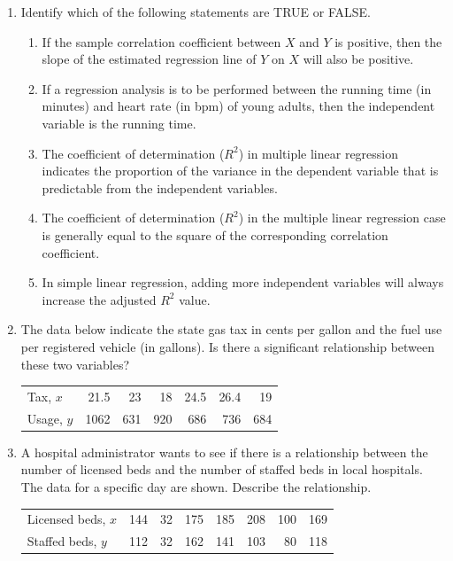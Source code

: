 \documentclass{article}
\begin{document}
\begin{enumerate}
    \item Identify which of the following statements are TRUE or FALSE.
    \begin{enumerate}
        \item If the sample correlation coefficient between $X$ and $Y$ is positive, then the slope of the estimated regression line of $Y$ on $X$ will also be positive.
        \item If a regression analysis is to be performed between the running time (in minutes) and heart rate (in bpm) of young adults, then the independent variable is the running time. 
        \item The coefficient of determination ($R^2$) in multiple linear regression indicates the proportion of the variance in the dependent variable that is predictable from the independent variables.
        \item The coefficient of determination ($R^2$) in the multiple linear regression case is generally equal to the square of the corresponding correlation coefficient.
        \item In simple linear regression, adding more independent variables will always increase the adjusted $R^2$ value.
    \end{enumerate}

    \item The data below indicate the state gas tax in cents per gallon and the fuel use per registered vehicle (in gallons). Is there a significant relationship between these two variables?
    \begin{table}[H]
    \begin{tabular}{lrrrrrr}
    Tax, $x$ &21.5&23&18&24.5&26.4&19\\
    Usage, $y$ &1062&631&920&686&736&684\\
    \end{tabular}
    \end{table}

    \item A hospital administrator wants to see if there is a relationship between the number of licensed beds and the number of staffed beds in local hospitals. The data for a specific day are shown. Describe the relationship.
    \begin{table}[H]
    \begin{tabular}{lrrrrrrr}
    Licensed beds, $x$ & 144 & 32 & 175 & 185 & 208 & 100 & 169 \\
    Staffed beds, $y$ & 112 & 32 & 162 & 141 & 103 & 80 & 118
    \end{tabular}
    \end{table}


\end{enumerate}
\end{document}
